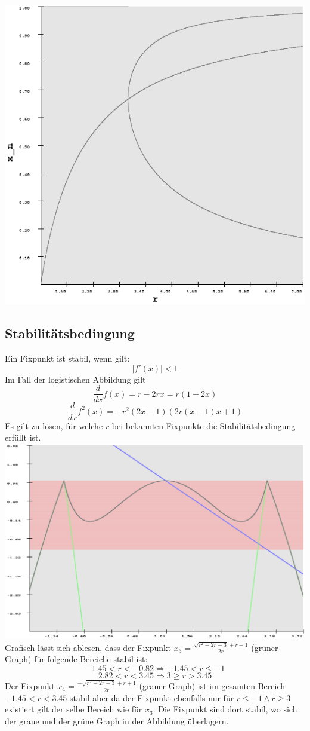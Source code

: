 \documentclass{scrartcl}
\begin{document}
\includegraphics[scale=0.3]{analy-periodenv}
\newline
\subsection{ Stabilitätsbedingung }
Ein Fixpunkt ist stabil, wenn gilt:
$$\mid f'(x)\mid <1$$
Im Fall der logistischen Abbildung gilt
$$\frac{d}{dx}f(x)=r-2rx=r(1-2x)$$
$$\frac{d}{dx}f^2(x)=-r^2(2x-1)(2r(x-1)x+1)$$
\newline
Es gilt zu lösen, für welche $r$ bei bekannten Fixpunkte die Stabilitätsbedingung erfüllt ist.
\newline
\includegraphics[scale=0.4]{stable_fixpoints}
\newline
Grafisch lässt sich ablesen, dass der Fixpunkt $x_3=\frac{\sqrt{r^2-2 r-3}+r+1}{2 r}$ (grüner Graph) für folgende Bereiche stabil ist:
$$-1.45<r<-0.82 \Rightarrow -1.45 < r \leq -1$$
$$2.82<r<3.45 \Rightarrow 3 \geq r > 3.45$$
Der Fixpunkt $x_4=\frac{-\sqrt{r^2-2 r-3}+r+1}{2 r}$ (grauer Graph) ist im gesamten Bereich $-1.45<r<3.45$ stabil aber da der Fixpunkt ebenfalls nur für $r \leq -1 \land r \geq 3$ existiert gilt der selbe Bereich wie für $x_3$. Die Fixpunkt sind dort stabil, wo sich der graue und der grüne Graph in der Abbildung überlagern.
\end{document}
